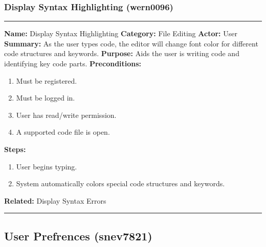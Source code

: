 \documentclass[11pt]{report}
\begin{document}
\subsubsection{Display Syntax Highlighting (wern0096)}
\vspace{2pt}
\hrule
\vspace{8pt}
	\noindent\textbf{Name:} Display Syntax Highlighting \newline
	\textbf{Category:} File Editing \newline
	\textbf{Actor:} User \newline
	\textbf{Summary:} As the user types code, the editor will change font color for different code structures and keywords. \newline
	\textbf{Purpose:} Aids the user is writing code and identifying key code parts. \newline
	\textbf{Preconditions:}
	\begin{enumerate}
		\item Must be registered.
		\item Must be logged in.
		\item User has read/write permission.
		\item A supported code file is open.
	\end{enumerate}
	\textbf{Steps:}
	\begin{enumerate}
		\item User begins typing.
		\item System automatically colors special code structures and keywords.
	\end{enumerate}
	\textbf{Related:} Display Syntax Errors
\vspace{8pt}
\hrule
\newpage

\subsection{User Prefrences (snev7821)}
\end{document}
